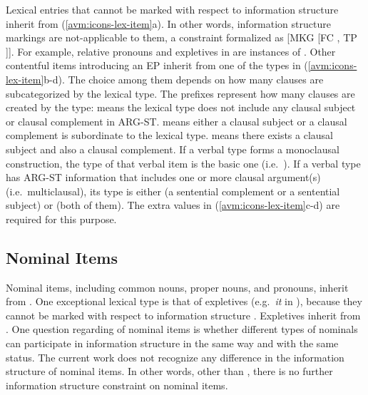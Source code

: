 Lexical entries that cannot be marked with respect to information
structure inherit from 
(\ref{avm:icons-lex-item}a). In other words, information structure
markings are not-applicable to them, a constraint formalized as [MKG
  [FC , TP ]]. For
example, relative pronouns and expletives in  are
instances of .  Other contentful items
introducing an EP inherit from one of the types in
(\ref{avm:icons-lex-item}b-d). The choice among them depends on how
many clauses are subcategorized by the lexical type.  The prefixes
represent how many clauses are created by the type:  means
the lexical type does not include any clausal subject or clausal
complement in ARG-ST.  means either a clausal subject or a
clausal complement is subordinate to the lexical type. 
means there exists a clausal subject and also a clausal complement.
If a verbal type forms a monoclausal construction, the
 type of that verbal item is the basic one
(i.e.\ ).  If a verbal type has ARG-ST
information that includes one or more clausal argument(s)
(i.e.\ multiclausal), its  type is either
 (a sentential complement or a sentential
subject) or  (both of them).  The extra
 values in (\ref{avm:icons-lex-item}c-d) are required
for this purpose.



\subsection{Nominal Items}
\label{10:ssec:nominal}

Nominal items, including common nouns, proper nouns, and pronouns,
inherit from .  One exceptional lexical type
is that of expletives (e.g.\ \textit{it} in ), because
they cannot be marked with respect to information structure
\citep{lambrecht:96}.  Expletives inherit from
.  One question regarding  of
nominal items is whether different types of nominals can participate
in information structure in the same way and with the same status. The
current work does not recognize any difference in the information
structure of nominal items.  In other words, other than
, there is no further information structure
constraint on nominal items.


